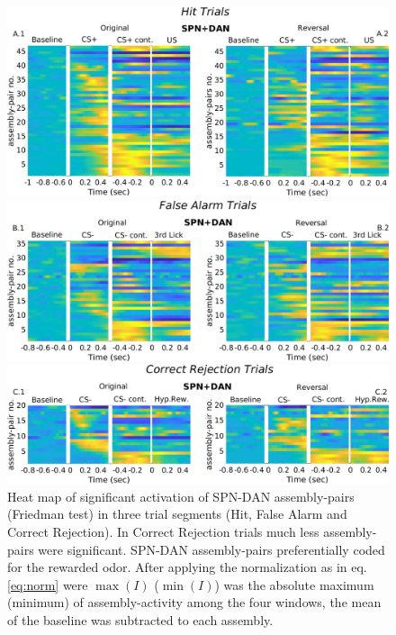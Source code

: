 \begin{figure}[H]
\centering
\includegraphics[scale=0.4]{figures/SPN_DANHit.pdf}

\vspace{0.5cm}

\includegraphics[scale=0.4]{figures/HeatFA_SPN_DAN.pdf}

\vspace{0.5cm}

\includegraphics[scale=0.4]{figures/HeatCR_SPN_DAN.pdf}
\caption{Heat map of significant activation of SPN-DAN assembly-pairs (Friedman test) in three trial segments (Hit, False Alarm and Correct Rejection). In Correct Rejection trials much less assembly-pairs were significant. SPN-DAN assembly-pairs preferentially coded for the rewarded odor. After applying the normalization as in eq. \ref{eq:norm} were $\max(I)$ ($\min(I)$) was the absolute maximum (minimum) of assembly-activity among the four windows, the mean of the baseline was subtracted to each assembly.}
\label{fig:HeatSPN_DANComp}
\end{figure}
